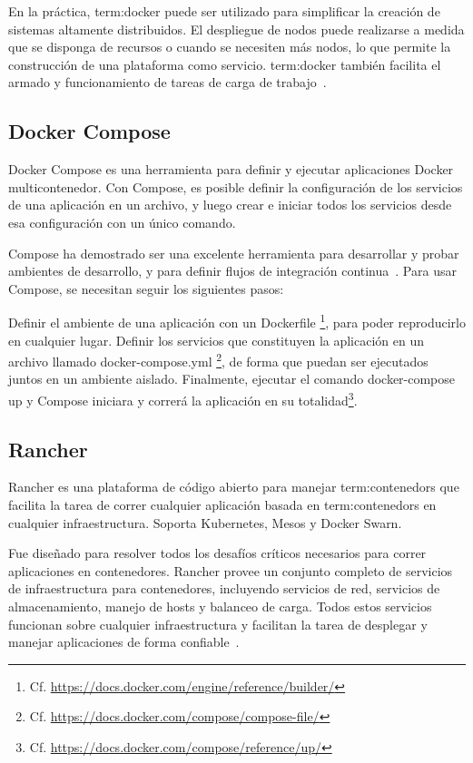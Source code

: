 En la práctica, \gls{term:docker} puede ser utilizado para simplificar la creación de
sistemas altamente distribuidos. El despliegue de nodos puede realizarse a
medida que se disponga de recursos o cuando se necesiten más nodos, lo que
permite la construcción de una plataforma como servicio. \gls{term:docker} también
facilita el armado y funcionamiento de tareas de carga de
trabajo~\cite{docker}.

\subsection{Docker Compose}
\label{anexo_compose}

Docker Compose es una herramienta para definir y ejecutar aplicaciones Docker
multicontenedor. Con Compose, es posible definir la configuración de los
servicios de una aplicación en un archivo, y luego crear e iniciar todos los
servicios desde esa configuración con un único comando.

Compose ha demostrado ser una excelente herramienta para desarrollar y probar
ambientes de desarrollo, y para definir flujos de integración
continua~\cite{compose}. Para usar Compose, se necesitan seguir los siguientes
pasos:

Definir el ambiente de una aplicación con un Dockerfile
\footnote{Cf. \url{https://docs.docker.com/engine/reference/builder/}}, para
poder reproducirlo en cualquier lugar.  Definir los servicios que constituyen
la aplicación en un archivo llamado docker-compose.yml
\footnote{Cf.  \url{https://docs.docker.com/compose/compose-file/}}, de forma
que puedan ser ejecutados juntos en un ambiente aislado.  Finalmente, ejecutar
el comando docker-compose up y Compose iniciara y correrá la aplicación en su
totalidad\footnote{Cf. \url{https://docs.docker.com/compose/reference/up/}}.


\subsection{Rancher}

Rancher es una plataforma de código abierto para manejar \glspl{term:contenedor} que
facilita la tarea de correr cualquier aplicación basada en \glspl{term:contenedor} en
cualquier infraestructura. Soporta Kubernetes, Mesos y Docker Swarn.

Fue diseñado para resolver todos los desafíos críticos necesarios para correr
aplicaciones en contenedores. Rancher provee un conjunto completo de servicios
de infraestructura para contenedores, incluyendo servicios de red, servicios de
almacenamiento, manejo de hosts y balanceo de carga. Todos estos servicios
funcionan sobre cualquier infraestructura y facilitan la tarea de desplegar y
manejar aplicaciones de forma confiable~\cite{rancher}.

